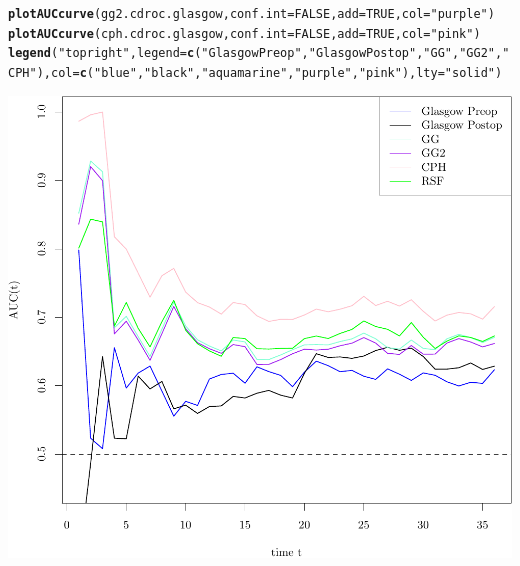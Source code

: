 \documentclass{article}\usepackage[]{graphicx}\usepackage[]{color}
\makeatletter
\def\maxwidth{ %
  \ifdim\Gin@nat@width>\linewidth
    \linewidth
  \else
    \Gin@nat@width
  \fi
}
\newcommand{\hlnum}[1]{\textcolor[rgb]{0.686,0.059,0.569}{#1}}%
\newcommand{\hlstr}[1]{\textcolor[rgb]{0.192,0.494,0.8}{#1}}%
\newcommand{\hlstd}[1]{\textcolor[rgb]{0.345,0.345,0.345}{#1}}%
\newcommand{\hlkwc}[1]{\textcolor[rgb]{0.333,0.667,0.333}{#1}}%
\newcommand{\hlkwd}[1]{\textcolor[rgb]{0.737,0.353,0.396}{\textbf{#1}}}%
\newenvironment{kframe}{%
 \def\at@end@of@kframe{}%
 \ifinner\ifhmode%
  \def\at@end@of@kframe{\end{minipage}}%
  \begin{minipage}{\columnwidth}%
 \fi\fi%
 \def\FrameCommand##1{\hskip\@totalleftmargin \hskip-\fboxsep
 \colorbox{shadecolor}{##1}\hskip-\fboxsep
     \hskip-\linewidth \hskip-\@totalleftmargin \hskip\columnwidth}%
 \MakeFramed {\advance\hsize-\width
   \@totalleftmargin\z@ \linewidth\hsize
   \@setminipage}}%
 {\par\unskip\endMakeFramed%
 \at@end@of@kframe}
\newenvironment{knitrout}{}{} %
\makeatother
\begin{document}
\begin{knitrout}
\begin{kframe}
\begin{alltt}
\hlkwd{plotAUCcurve}\hlstd{(gg2.cdroc.glasgow,} \hlkwc{conf.int} \hlstd{=} \hlnum{FALSE}\hlstd{,} \hlkwc{add} \hlstd{=} \hlnum{TRUE}\hlstd{,} \hlkwc{col} \hlstd{=} \hlstr{"purple"}\hlstd{)}
\hlkwd{plotAUCcurve}\hlstd{(cph.cdroc.glasgow,} \hlkwc{conf.int} \hlstd{=} \hlnum{FALSE}\hlstd{,} \hlkwc{add} \hlstd{=} \hlnum{TRUE}\hlstd{,} \hlkwc{col} \hlstd{=} \hlstr{"pink"}\hlstd{)}
\hlkwd{legend}\hlstd{(}\hlstr{"topright"}\hlstd{,} \hlkwc{legend} \hlstd{=} \hlkwd{c}\hlstd{(}\hlstr{"Glasgow Preop"}\hlstd{,} \hlstr{"Glasgow Postop"}\hlstd{,} \hlstr{"GG"}\hlstd{,} \hlstr{"GG2"}\hlstd{,} \hlstr{"CPH"}\hlstd{),} \hlkwc{col} \hlstd{=} \hlkwd{c}\hlstd{(}\hlstr{"blue"}\hlstd{,} \hlstr{"black"}\hlstd{,} \hlstr{"aquamarine"}\hlstd{,} \hlstr{"purple"}\hlstd{,} \hlstr{"pink"}\hlstd{),} \hlkwc{lty} \hlstd{=} \hlstr{"solid"}\hlstd{)}
\end{alltt}
\end{kframe}

{\centering \includegraphics[width=\maxwidth]{figure/05-timeROC-1} 

}



\end{knitrout}
\end{document}
